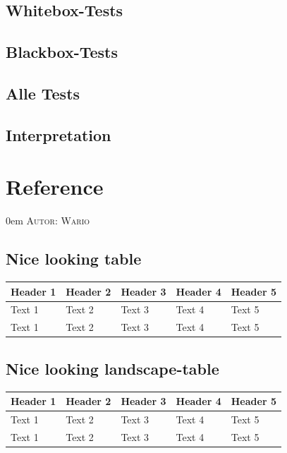 \documentclass{article}
\makeatletter
\newcommand{\sectionauthor}[1]{
	{\parindent 0em \large \scshape Autor: #1 \par \nobreak \vspace*{1em}}
	\@afterheading
}
\makeatother
\begin{document}
\subsection{Whitebox-Tests}

\subsection{Blackbox-Tests}

\subsection{Alle Tests}

\subsection{Interpretation}

\newpage

\section{Reference}
\sectionauthor{Wario}

\subsection{Nice looking table}
\begin{longtable}{@{}lllll@{}}
\toprule
\textbf{Header 1} & \textbf{Header 2} & \textbf{Header 3} & \textbf{Header 4} & \textbf{Header 5} \\* \midrule
\endfirsthead
%
\endhead
%
Text 1            & Text 2            & Text 3            & Text 4            & Text 5            \\
Text 1            & Text 2            & Text 3            & Text 4            & Text 5            \\* \bottomrule
\end{longtable}

\subsection{Nice looking landscape-table}
\begin{landscape}
\begin{longtable}{@{}lllll@{}}
\toprule
\textbf{Header 1} & \textbf{Header 2} & \textbf{Header 3} & \textbf{Header 4} & \textbf{Header 5} \\* \midrule
\endfirsthead
%
\endhead
%
Text 1            & Text 2            & Text 3            & Text 4            & Text 5            \\
Text 1            & Text 2            & Text 3            & Text 4            & Text 5            \\* \bottomrule
\end{longtable}
\end{landscape}

\newpage
\end{document}

